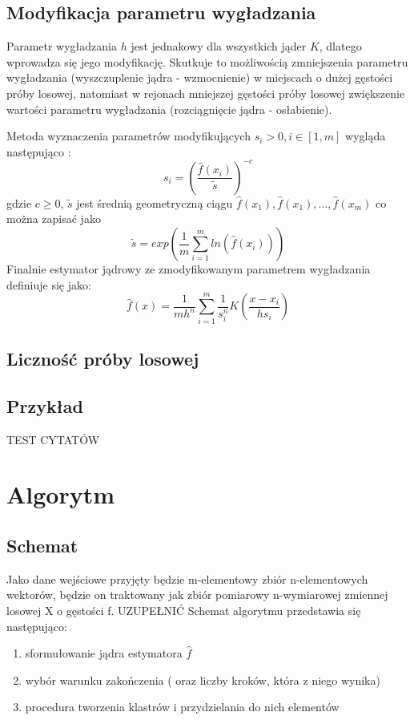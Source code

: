 \subsection{Modyfikacja parametru wygładzania}
\label{subsec:modyfikacje_h}
Parametr wygładzania $h$ jest jednakowy dla wszystkich jąder $K$, dlatego wprowadza się jego modyfikację. Skutkuje to możliwością zmniejszenia parametru wygładzania (wyszczuplenie jądra - wzmocnienie) w miejscach o dużej gęstości próby losowej, natomiast w rejonach mniejszej gęstości próby losowej zwiększenie wartości parametru wygładzania (rozciągnięcie jądra - osłabienie).

Metoda wyznaczenia parametrów modyfikujących $s_i>0, i \in [1, m]$ wygląda następująco :
\begin{equation}
s_i= {(\frac{\hat{f}(x_i)}{\tilde{s}})}^{-c}
\end{equation}
gdzie $c \geq 0$, $\tilde{s}$ jest średnią geometryczną ciągu $\hat{f}(x_1), \hat{f}(x_1), ..., \hat{f}(x_m)$ co można zapisać jako
\begin{equation}
\tilde{s} = exp(\frac{1}{m} \displaystyle\sum_{i=1}^{m} ln(\hat{f}(x_i)) )
\end{equation} 
Finalnie estymator jądrowy ze zmodyfikowanym parametrem wygładzania definiuje się jako:
\begin{equation}
\label{eq:est_mod}
\hat{f}(x)=\frac{1}{mh^n} \displaystyle \sum_{i=1}^{m} \frac{1}{s_i^n} K(\frac{x-x_i}{hs_i})
\end{equation}

\subsection{Liczność próby losowej}

\subsection{Przykład}

TEST CYTATÓW
\cite{Kul10}
\cite{Kul05}
\cite{Kul12}



\section{Algorytm}
\label{sec:algorytm}
\subsection{Schemat}
\label{subsec:schemat}
Jako dane wejściowe przyjęty będzie m-elementowy zbiór n-elementowych wektorów, będzie on traktowany jak zbiór pomiarowy n-wymiarowej zmiennej losowej X o gęstości f. UZUPEŁNIĆ
Schemat algorytmu przedstawia się następująco:
\begin{enumerate}
\item sformułowanie jądra estymatora $\hat{f}$
\item wybór warunku zakończenia ( oraz liczby kroków, która z niego wynika)
\item procedura tworzenia klastrów i przydzielania do nich elementów
\end{enumerate}

